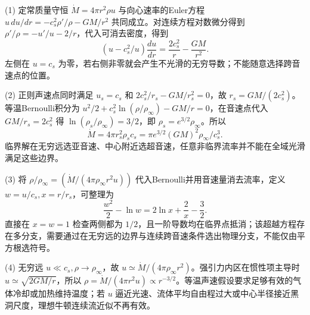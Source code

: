 (1) 定常质量守恒 \(\dot M=4\pi r^2\rho u\) 与向心速率的Euler方程 \(u\,du/dr=-c_s^2\rho'/\rho-GM/r^2\) 共同成立。对连续方程对数微分得到 \(\rho'/\rho=-u'/u-2/r\)，代入可消去密度，得到
\[
\boxed{(u-c_s^2/u)\frac{du}{dr}=\frac{2c_s^2}{r}-\frac{GM}{r^2}}.
\]
左侧在 \(u=c_s\) 为零，若右侧非零就会产生不光滑的无穷导数；不能随意选择跨音速点的位置。

(2) 正则声速点同时满足 \(u_s=c_s\) 和 \(2c_s^2/r_s-GM/r_s^2=0\)，故 \(r_s=GM/(2c_s^2)\)。等温Bernoulli积分为
\(u^2/2+c_s^2\ln(\rho/\rho_\infty)-GM/r=0\)，在音速点代入 \(GM/r_s=2c_s^2\) 得
\(\ln(\rho_s/\rho_\infty)=3/2\)，即 \(\rho_s=e^{3/2}\rho_\infty\)。所以
\[
\boxed{\dot M=4\pi r_s^2\rho_sc_s=\pi e^{3/2}(GM)^2\rho_\infty/c_s^3}.
\]
临界解在无穷远选亚音速、中心附近选超音速，任意非临界流率并不能在全域光滑满足这些边界。

(3) 将 \(\rho/\rho_\infty=(\dot M/(4\pi\rho_\infty r^2u))\) 代入Bernoulli并用音速量消去流率，定义 \(w=u/c_s,x=r/r_s\)，可整理为
\[
\boxed{\frac{w^2}{2}-\ln w=2\ln x+\frac2x-\frac32}.
\]
直接在 \(x=w=1\) 检查两侧都为 \(1/2\)，且一阶导数均在临界点抵消；该超越方程存在多分支，需要通过在无穷远的边界与连续跨音速条件选出物理分支，不能仅由平方根选符号。

(4) 无穷远 \(u\ll c_s,\rho\to\rho_\infty\)，故 \(u\simeq\dot M/(4\pi\rho_\infty r^2)\)。强引力内区在惯性项主导时 \(u\simeq\sqrt{2GM/r}\)，所以 \(\rho=\dot M/(4\pi r^2u)\propto r^{-3/2}\)。等温声速假设要求足够有效的气体冷却或加热维持温度；若 \(u\) 逼近光速、流体平均自由程过大或中心半径接近黑洞尺度，理想牛顿连续流近似不再有效。
